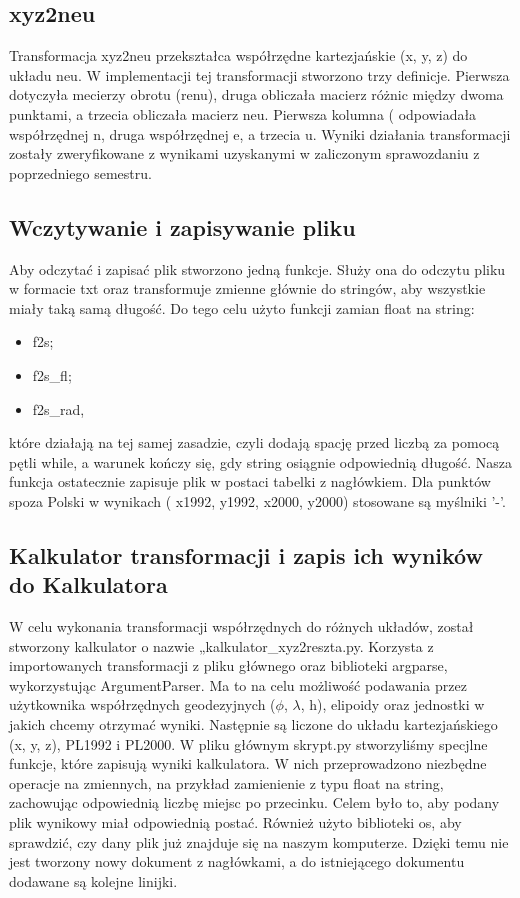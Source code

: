 \documentclass[10pt,a4paper]{article}
\begin{document}
	
	\subsection{xyz2neu} 
	Transformacja xyz2neu przekształca współrzędne kartezjańskie (x, y, z) do układu neu. W implementacji tej transformacji stworzono trzy definicje. Pierwsza dotyczyła mecierzy obrotu (renu), druga obliczała macierz różnic między dwoma punktami, a trzecia obliczała macierz neu. Pierwsza kolumna ( odpowiadała współrzędnej n, druga współrzędnej e, a trzecia u. Wyniki działania transformacji zostały zweryfikowane z wynikami uzyskanymi w zaliczonym sprawozdaniu z poprzedniego semestru. 
	\newpage
	\subsection{Wczytywanie i zapisywanie pliku}
	Aby odczytać i zapisać plik stworzono jedną funkcje. Służy ona do odczytu pliku w formacie txt oraz transformuje zmienne głównie do stringów, aby wszystkie miały taką samą długość. Do tego celu użyto funkcji zamian float na string: 

	\begin{itemize}
		\item f2s;
		\item f2s\_{}fl;
		\item f2s\_{}rad,

	\end{itemize}
	które działają na tej samej zasadzie, czyli dodają spację przed liczbą za pomocą pętli while, a warunek kończy się, gdy string osiągnie odpowiednią długość. Nasza funkcja ostatecznie zapisuje plik w postaci tabelki z nagłówkiem. Dla punktów spoza Polski w wynikach ( x1992, y1992, x2000, y2000) stosowane są myślniki '-'.

	\subsection{Kalkulator transformacji i zapis ich wyników do Kalkulatora}
	W celu wykonania transformacji współrzędnych do różnych układów, został stworzony kalkulator o nazwie „kalkulator\_{}xyz2reszta.py. Korzysta z importowanych transformacji z pliku głównego oraz biblioteki argparse, wykorzystując ArgumentParser.
	Ma to na celu możliwość podawania przez użytkownika współrzędnych geodezyjnych ($\phi$, $\lambda$, h), elipoidy oraz jednostki w jakich chcemy otrzymać wyniki. Następnie są liczone do układu kartezjańskiego (x, y, z), PL1992 i PL2000.
	\newline
	W pliku głównym skrypt.py stworzyliśmy specjlne funkcje, które zapisują wyniki kalkulatora. 
	W nich przeprowadzono niezbędne operacje na zmiennych, na przykład zamienienie z typu float na string, zachowując odpowiednią liczbę miejsc po przecinku. Celem było to, aby podany plik wynikowy miał odpowiednią postać. Również użyto biblioteki os, aby sprawdzić, czy dany plik już znajduje się na naszym komputerze. Dzięki temu nie jest tworzony nowy dokument z nagłówkami, a do istniejącego dokumentu dodawane są kolejne linijki.
	
\end{document}

